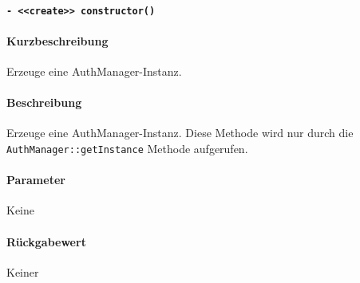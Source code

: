\paragraph{\texttt{- <<create>> constructor()}}%
\paragraph*{Kurzbeschreibung}
Erzeuge eine AuthManager-Instanz.
\paragraph*{Beschreibung}
Erzeuge eine AuthManager-Instanz.
Diese Methode wird nur durch die \verb#AuthManager::getInstance# Methode aufgerufen.
\paragraph*{Parameter}
Keine
\paragraph*{Rückgabewert}
Keiner